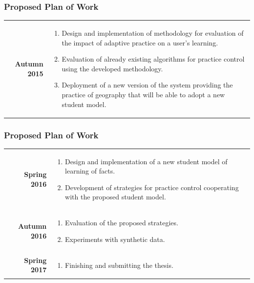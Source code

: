 \documentclass[xcolor=svgnames]{beamer}
\begin{document}
\begin{frame}
\frametitle{Proposed Plan of Work}
\begin{tabularx}{\textwidth}{rX}
	\textbf{Autumn 2015} &
		\vspace{-0.5cm}
		\begin{enumerate}
			\item Design and implementation of methodology for evaluation of the impact
				of adaptive practice on a user's learning.
			\item Evaluation of already existing algorithms for practice control using the
				developed methodology.
			\item Deployment of a new version of the system providing the practice of
				geography that will be able to adopt a new student model.
		\end{enumerate}
\end{tabularx}
\end{frame}
\begin{frame}
\frametitle{Proposed Plan of Work}
\begin{tabularx}{\textwidth}{rX}
	\textbf{Spring 2016} &
		\vspace{-0.5cm}
		\begin{enumerate}
			\item Design and implementation of a new student model of learning of
				facts.
			\item Development of strategies for practice control cooperating with the
				proposed student model.
		\end{enumerate}\\
	\textbf{Autumn 2016} &
		\vspace{-0.5cm}
		\begin{enumerate}
			\item Evaluation of the proposed strategies.
			\item Experiments with synthetic data.
		\end{enumerate}\\
	\textbf{Spring 2017} &
		\vspace{-0.5cm}
		\begin{enumerate}
			\item Finishing and submitting the thesis.
		\end{enumerate}
\end{tabularx}
\end{frame}
\end{document}
